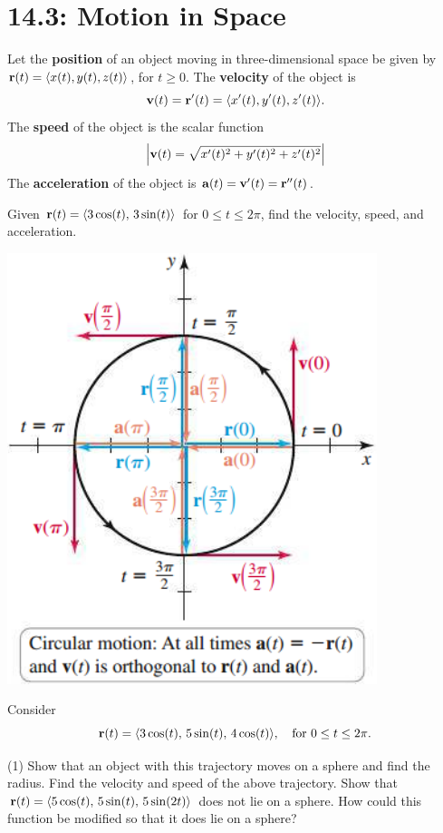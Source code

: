 \documentclass[mathNotesPreamble]{subfiles}
\begin{document}
\section{14.3: Motion in Space}
  \begin{defn*}
    Let the \textbf{position} of an object moving in three-dimensional space be given by \newline${\mathbf{r}}(t)={\left\langle x(t),y(t),z(t) \right\rangle}$, for $t\geq 0$. The \textbf{velocity} of the object is
      \[{\mathbf{v}}(t)={\mathbf{r}}'(t)={\left\langle x'(t),y'(t),z'(t) \right\rangle}.\]
    The \textbf{speed} of the object is the scalar function
      \[{\left\vert{\mathbf{v}}(t)=\sqrt{x'(t)^2+y'(t)^2+z'(t)^2}\right\vert}\]
    The \textbf{acceleration} of the object is $\mathbf a(t)={\mathbf{v}}'(t)={\mathbf{r}}''(t)$.
  \end{defn*}
  \begin{ex*}
    Given ${\mathbf{r}}(t)={\left\langle 3\cos(t),\,3\sin(t) \right\rangle}$ for $0\leq t\leq 2\pi$, find the velocity, speed, and acceleration.
  \end{ex*}
  \begin{flushright}
    \includegraphics[width=0.35\linewidth]{images/briggs_14_03/fig14_13}
  \end{flushright}
  \pagebreak

  \noindent
  \begin{ex*}
    Consider
      \[{\mathbf{r}}(t)={\left\langle 3\cos(t),\,5\sin(t),\,4\cos(t) \right\rangle},\quad\textnormal{for } 0\leq t\leq 2\pi.\]
  \end{ex*}
  \begin{tasks}[after-item-skip=\stretch{1}](1)
    \task Show that an object with this trajectory moves on a sphere and find the radius.
    \task Find the velocity and speed of the above trajectory.
    \task Show that ${\mathbf{r}}(t)={\left\langle 5\cos(t),\,5\sin(t),\,5\sin(2t) \right\rangle}$ does not lie on a sphere. How could this function be modified so that it does lie on a sphere?
  \end{tasks}
  \pagebreak
\end{document}

